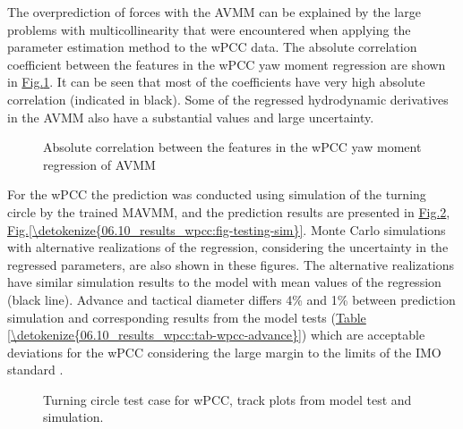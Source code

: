 \documentclass[review]{elsarticle}
\begin{document}
\sphinxAtStartPar
The over\sphinxhyphen{}prediction of forces with the AVMM can be explained by the large problems with multicollinearity that were encountered when applying the parameter estimation method to the wPCC data. The absolute correlation coefficient between the features in the wPCC yaw moment regression are shown in \hyperref[\detokenize{06.10_results_wpcc:fig-ncorr}]{Fig.\@ \ref{\detokenize{06.10_results_wpcc:fig-ncorr}}}. It can be seen that most of the coefficients have very high absolute correlation (indicated in black). Some of the regressed hydrodynamic derivatives in the AVMM also have a substantial values and large uncertainty.

\begin{figure}[H]
\centering
\capstart

\noindent{}
\caption{Absolute correlation between the features in the wPCC yaw moment regression of AVMM}\label{\detokenize{06.10_results_wpcc:fig-ncorr}}\end{figure}

\sphinxAtStartPar
For the wPCC the prediction was conducted using simulation of the turning circle by the trained MAVMM, and the prediction results are presented in \hyperref[\detokenize{06.10_results_wpcc:fig-track-plot-testing-sim}]{Fig.\@ \ref{\detokenize{06.10_results_wpcc:fig-track-plot-testing-sim}}}, \hyperref[\detokenize{06.10_results_wpcc:fig-testing-sim}]{Fig.\@ \ref{\detokenize{06.10_results_wpcc:fig-testing-sim}}}. Monte Carlo simulations with alternative realizations of the regression, considering the uncertainty in the regressed parameters, are also shown in these figures. The alternative realizations have similar simulation results to the model with mean values of the regression (black line).
Advance and tactical diameter \cite{imo_standards_2002} differs 4\% and 1\% between prediction simulation and corresponding results from the model tests (\hyperref[\detokenize{06.10_results_wpcc:tab-wpcc-advance}]{Table \ref{\detokenize{06.10_results_wpcc:tab-wpcc-advance}}})
which are acceptable deviations for the wPCC considering the large margin to the limits of the IMO standard \cite{imo_standards_2002}.

\begin{figure}[H]
\centering
\capstart

\noindent{}
\caption{Turning circle test case for wPCC, track plots from model test and simulation.}\label{\detokenize{06.10_results_wpcc:fig-track-plot-testing-sim}}\end{figure}
\end{document}
